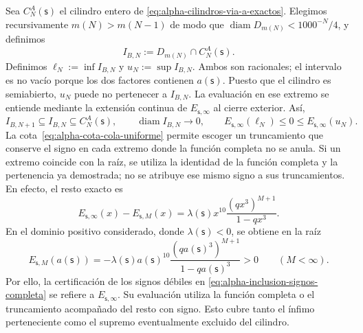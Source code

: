 Sea \(C_N^A(\mathsf s)\) el cilindro entero de
\eqref{eq:alpha-cilindros-via-a-exactos}. Elegimos recursivamente
\(m(N)>m(N-1)\) de modo que
\(\operatorname{diam}D_{m(N)}<1000^{-N}/4\), y definimos
\begin{equation}
I_{B,N}:=D_{m(N)}\cap C_N^A(\mathsf s).
 \label{eq:alpha-intervalos-b-completos}
\end{equation}
Definimos
\(\ell_N:=\inf I_{B,N}\) y \(u_N:=\sup I_{B,N}\). Ambos son racionales;
el intervalo es no vacío porque los dos factores contienen
\(a(\mathsf s)\). Puesto que el cilindro es semiabierto, \(u_N\) puede no
pertenecer a \(I_{B,N}\). La evaluación en ese extremo se entiende mediante
la extensión continua de \(E_{\mathsf s,\infty}\) al cierre exterior. Así,
\begin{equation}
 I_{B,N+1}\subseteq I_{B,N}\subseteq C_N^A(\mathsf s),
 \qquad \operatorname{diam}I_{B,N}\longrightarrow0,
 \qquad E_{\mathsf s,\infty}(\ell_N)\leq0\leq
 E_{\mathsf s,\infty}(u_N).
 \label{eq:alpha-inclusion-signos-completa}
\end{equation}
La cota~\eqref{eq:alpha-cota-cola-uniforme} permite escoger un
truncamiento que conserve el signo en cada extremo donde la función completa
no se anula. Si un extremo coincide con la raíz, se utiliza la identidad de
la función completa y la pertenencia ya demostrada; no se atribuye ese mismo
signo a sus truncamientos. En efecto, el resto exacto es
\[
 E_{\mathsf s,\infty}(x)-E_{\mathsf s,M}(x)
 =\lambda(\mathsf s)x^{10}
   \frac{(qx^3)^{M+1}}{1-qx^3}.
\]
En el dominio positivo considerado, donde \(\lambda(\mathsf s)<0\), se
obtiene en la raíz
\[
 E_{\mathsf s,M}(a(\mathsf s))
 =-\lambda(\mathsf s)a(\mathsf s)^{10}
   \frac{(qa(\mathsf s)^3)^{M+1}}{1-qa(\mathsf s)^3}>0
 \qquad(M<\infty).
\]
Por ello, la certificación de los signos débiles en
\eqref{eq:alpha-inclusion-signos-completa} se refiere a
\(E_{\mathsf s,\infty}\). Su evaluación utiliza la función completa o el
truncamiento acompañado del resto con signo. Esto cubre tanto el ínfimo
perteneciente como el supremo eventualmente excluido del cilindro.

